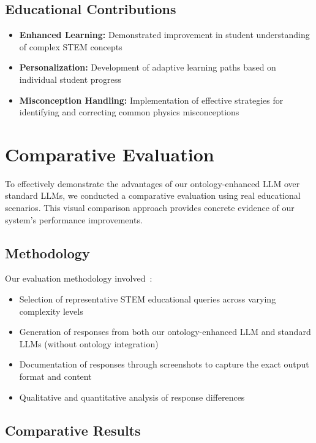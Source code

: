 \subsection{Educational Contributions}
\begin{itemize}
    \item \textbf{Enhanced Learning:} Demonstrated improvement in student understanding of complex STEM concepts~\cite{rivera2024impact}
    \item \textbf{Personalization:} Development of adaptive learning paths based on individual student progress~\cite{rodriguez2024adaptive}
    \item \textbf{Misconception Handling:} Implementation of effective strategies for identifying and correcting common physics misconceptions~\cite{kim2024assessment}
\end{itemize}

\section{Comparative Evaluation}
\label{sec:comparative-evaluation}

To effectively demonstrate the advantages of our ontology-enhanced LLM over standard LLMs, we conducted a comparative evaluation using real educational scenarios. This visual comparison approach provides concrete evidence of our system's performance improvements.

\subsection{Methodology}
\label{subsec:comparison-methodology}

Our evaluation methodology involved~\cite{chen2024comparing}:

\begin{itemize}
    \item Selection of representative STEM educational queries across varying complexity levels
    \item Generation of responses from both our ontology-enhanced LLM and standard LLMs (without ontology integration)
    \item Documentation of responses through screenshots to capture the exact output format and content
    \item Qualitative and quantitative analysis of response differences~\cite{wilson2024educational}
\end{itemize}

\subsection{Comparative Results}
\label{subsec:comparative-results}


